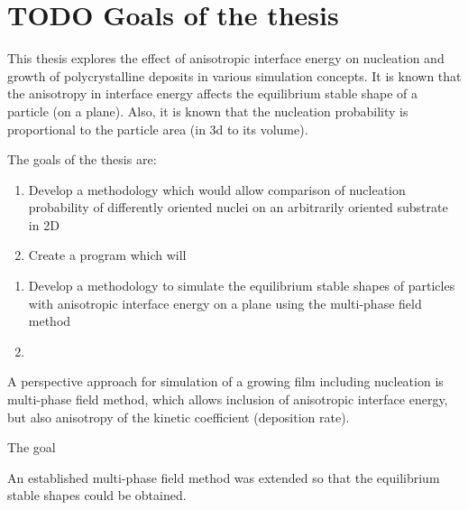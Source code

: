 \section{TODO Goals of the thesis}
This thesis explores the effect of anisotropic interface energy on nucleation and growth of polycrystalline deposits in various simulation concepts. It is known that the anisotropy in interface energy affects the equilibrium stable shape of a particle (on a plane). Also, it is known that the nucleation probability is proportional to the particle area (in 3d to its volume).

The goals of the thesis are:
\begin{enumerate}
	\item Develop a methodology which would allow comparison of nucleation probability of differently oriented nuclei on an arbitrarily oriented substrate in 2D
	\item Create a program which will 
\end{enumerate}

\begin{enumerate}
	\item Develop a methodology to simulate the equilibrium stable shapes of particles with anisotropic interface energy on a plane using	the multi-phase field method 
	\item 
\end{enumerate}




A perspective approach for simulation of a growing film including nucleation is multi-phase field method, which allows inclusion of anisotropic interface energy, but also anisotropy of the kinetic coefficient (deposition rate).

The goal 

An established multi-phase field method was extended so that the equilibrium stable shapes could be obtained.




